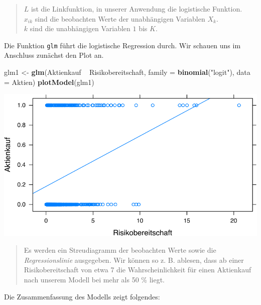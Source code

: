 \documentclass[12pt,ngerman,]{book}
\newenvironment{Shaded}{\begin{snugshade}}{\end{snugshade}}
\newcommand{\KeywordTok}[1]{\textcolor[rgb]{0.13,0.29,0.53}{\textbf{{#1}}}}
\newcommand{\DataTypeTok}[1]{\textcolor[rgb]{0.13,0.29,0.53}{{#1}}}
\newcommand{\StringTok}[1]{\textcolor[rgb]{0.31,0.60,0.02}{{#1}}}
\newcommand{\NormalTok}[1]{{#1}}
\renewenvironment{Shaded}{\begin{kframe}}{\end{kframe}}
\begin{document}
\begin{quote}
\(L\) ist die Linkfunktion, in unserer Anwendung die logistische
Funktion.\\
\(x_{ik}\) sind die beobachten Werte der unabhängigen Variablen
\(X_k\).\\
\(k\) sind die unabhängigen Variablen \(1\) bis \(K\).
\end{quote}

Die Funktion \texttt{glm} führt die logistische Regression durch. Wir
schauen uns im Anschluss zunächst den Plot an.

\begin{Shaded}
\begin{Highlighting}[]
\NormalTok{glm1 <-}\StringTok{ }\KeywordTok{glm}\NormalTok{(Aktienkauf ~}\StringTok{ }\NormalTok{Risikobereitschaft, }\DataTypeTok{family =} \KeywordTok{binomial}\NormalTok{(}\StringTok{"logit"}\NormalTok{),}
            \DataTypeTok{data =} \NormalTok{Aktien)}
\KeywordTok{plotModel}\NormalTok{(glm1)}
\end{Highlighting}
\end{Shaded}

\begin{center}\includegraphics[width=0.7\linewidth]{072_klassifizierende_Regression_files/figure-latex/unnamed-chunk-7-1} \end{center}

\begin{quote}
Es werden ein Streudiagramm der beobachten Werte sowie die
\emph{Regressionslinie} ausgegeben. Wir können so z. B. ablesen, dass ab
einer Risikobereitschaft von etwa 7 die Wahrscheinlichkeit für einen
Aktienkauf nach unserem Modell bei mehr als 50 \% liegt.
\end{quote}

Die Zusammenfassung des Modells zeigt folgendes:
\end{document}
